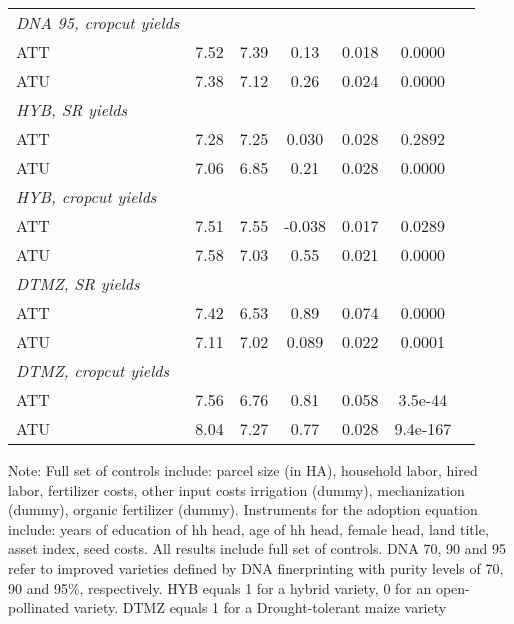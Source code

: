\begin{table}[H]
{\begin{threeparttable}
\begin{tabular}{l cccccc}
    \textit{DNA 95, cropcut yields}&            &            &            &            &            \\
    ATT         &        7.52&        7.39&        0.13&       0.018&      0.0000\\
    ATU         &        7.38&        7.12&        0.26&       0.024&      0.0000\\
    \textit{HYB, SR yields}&            &            &            &            &            \\
    ATT         &        7.28&        7.25&       0.030&       0.028&      0.2892\\
    ATU         &        7.06&        6.85&        0.21&       0.028&      0.0000\\
    \textit{HYB, cropcut yields}&            &            &            &            &            \\
    ATT         &        7.51&        7.55&      -0.038&       0.017&      0.0289\\
    ATU         &        7.58&        7.03&        0.55&       0.021&      0.0000\\
    \textit{DTMZ, SR yields}&            &            &            &            &            \\
    ATT         &        7.42&        6.53&        0.89&       0.074&      0.0000\\
    ATU         &        7.11&        7.02&       0.089&       0.022&      0.0001\\
    \textit{DTMZ, cropcut yields}&            &            &            &            &            \\
    ATT         &        7.56&        6.76&        0.81&       0.058&     3.5e-44\\
    ATU         &        8.04&        7.27&        0.77&       0.028&    9.4e-167\\
    \hline
    \hline
    \end{tabular}
    \begin{tablenotes}[flushleft]
    \footnotesize
    \item{Note: Full set of controls include: parcel size (in HA), household labor, hired labor, fertilizer costs, other input costs irrigation (dummy), mechanization (dummy), organic fertilizer (dummy). Instruments for the adoption equation include: years of education of hh head, age of hh head, female head, land title, asset index, seed costs. All results include full set of controls. DNA 70, 90 and 95 refer to improved varieties defined by DNA finerprinting with purity levels of 70, 90 and 95\%, respectively. HYB equals 1 for a hybrid variety, 0 for an open-pollinated variety. DTMZ equals 1 for a Drought-tolerant maize variety}
    \end{tablenotes}
    \end{threeparttable}
}
\end{table}
